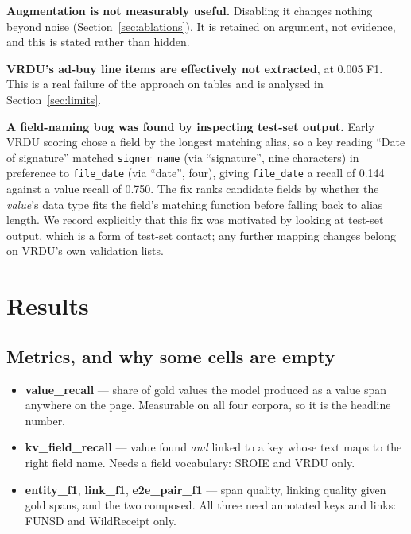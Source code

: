 \documentclass[11pt,a4paper]{article}
\newcommand{\code}[1]{\texttt{\small #1}}
\begin{document}
\textbf{Augmentation is not measurably useful.} Disabling it changes nothing beyond noise
(Section~\ref{sec:ablations}). It is retained on argument, not evidence, and this is stated
rather than hidden.

\textbf{VRDU's ad-buy line items are effectively not extracted}, at 0.005 F1. This is a real
failure of the approach on tables and is analysed in Section~\ref{sec:limits}.

\textbf{A field-naming bug was found by inspecting test-set output.} Early VRDU scoring chose a
field by the longest matching alias, so a key reading ``Date of signature'' matched
\code{signer\_name} (via ``signature'', nine characters) in preference to \code{file\_date} (via
``date'', four), giving \code{file\_date} a recall of 0.144 against a value recall of 0.750. The
fix ranks candidate fields by whether the \emph{value}'s data type fits the field's matching
function before falling back to alias length. We record explicitly that this fix was motivated by
looking at test-set output, which is a form of test-set contact; any further mapping changes
belong on VRDU's own validation lists.

\section{Results}
\label{sec:results}

\subsection{Metrics, and why some cells are empty}
\label{sec:metrics}

\begin{itemize}[leftmargin=1.4em,itemsep=1pt]
  \item \textbf{value\_recall} --- share of gold values the model produced as a value span
        anywhere on the page. Measurable on all four corpora, so it is the headline number.
  \item \textbf{kv\_field\_recall} --- value found \emph{and} linked to a key whose text maps to
        the right field name. Needs a field vocabulary: SROIE and VRDU only.
  \item \textbf{entity\_f1}, \textbf{link\_f1}, \textbf{e2e\_pair\_f1} --- span quality, linking
        quality given gold spans, and the two composed. All three need annotated keys and links:
        FUNSD and WildReceipt only.
\end{itemize}
\end{document}

